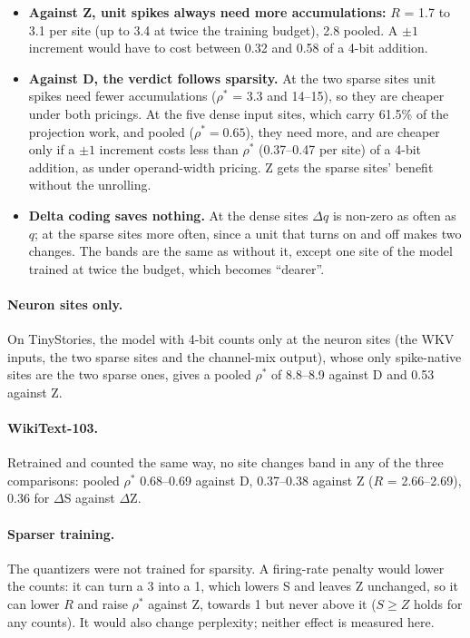 \documentclass[11pt]{article}
\begin{document}
\begin{itemize}
\item \textbf{Against Z, unit spikes always need more accumulations:} $R$ = 1.7 to 3.1 per site
  (up to 3.4 at twice the training budget), 2.8 pooled. A $\pm 1$ increment would have to cost
  between 0.32 and 0.58 of a 4-bit addition.
\item \textbf{Against D, the verdict follows sparsity.} At the two sparse sites unit spikes
  need fewer accumulations ($\rho^*$ = 3.3 and 14--15), so they are cheaper under both
  pricings. At the five dense input sites, which carry 61.5\% of the projection work, and pooled
  ($\rho^* = 0.65$), they need more, and are cheaper only if a $\pm 1$ increment costs less than
  $\rho^*$ (0.37--0.47 per site) of a 4-bit addition, as under operand-width pricing. Z gets the
  sparse sites' benefit without the unrolling.
\item \textbf{Delta coding saves nothing.} At the dense sites $\Delta q$ is non-zero as often as
  $q$; at the sparse sites more often, since a unit that turns on and off makes two changes. The
  bands are the same as without it, except one site of the model trained at twice the budget,
  which becomes ``dearer''.
\end{itemize}

\paragraph{Neuron sites only.} On TinyStories, the model with 4-bit counts only at the neuron
sites (the WKV inputs, the two sparse sites and the channel-mix output), whose only spike-native
sites are the two sparse ones, gives a pooled $\rho^*$ of 8.8--8.9 against D and 0.53 against Z.

\paragraph{WikiText-103.} Retrained and counted the same way, no site changes band in any of
the three comparisons: pooled $\rho^*$ 0.68--0.69 against D, 0.37--0.38 against Z
($R$ = 2.66--2.69), 0.36 for $\Delta$S against $\Delta$Z.

\paragraph{Sparser training.} The quantizers were not trained for sparsity. A firing-rate
penalty would lower the counts: it can turn a 3 into a 1, which lowers S and leaves Z unchanged,
so it can lower $R$ and raise $\rho^*$ against Z, towards 1 but never above it ($S \geq Z$ holds
for any counts). It would also change perplexity; neither effect is measured here.
\end{document}
